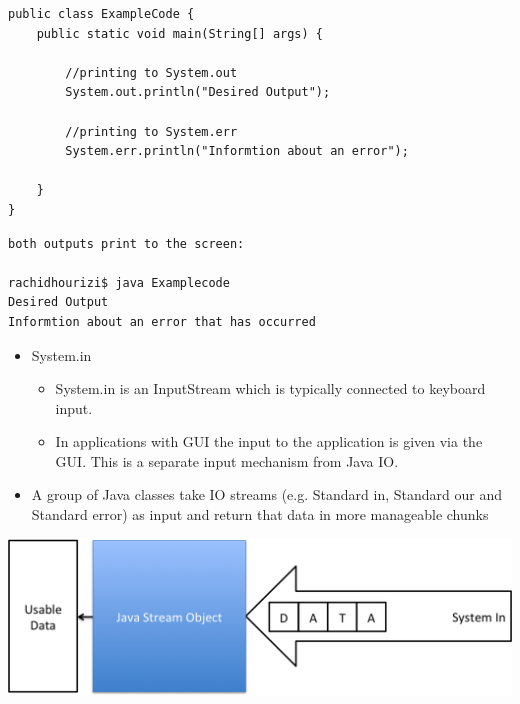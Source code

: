 \documentclass{beamer}
\begin{document}
\begin{frame}[fragile]
\small
\begin{block}{}
\begin{lstlisting}
public class ExampleCode {
	public static void main(String[] args) {
        
        //printing to System.out
        System.out.println("Desired Output");
        
        //printing to System.err
        System.err.println("Informtion about an error");

    }
}
\end{lstlisting}
\end{block}

\begin{block}{}
\begin{lstlisting}
both outputs print to the screen:

rachidhourizi$ java Examplecode
Desired Output
Informtion about an error that has occurred

\end{lstlisting}
\end{block}

\end{frame}

\begin{frame}

\begin{itemize}
\item System.in

\begin{itemize}
\item System.in is an InputStream which is typically connected to keyboard input. 
\item In applications with GUI the input to the application is given via the GUI. This is a separate input mechanism
from Java IO.
\end{itemize}
\end{itemize}

\end{frame}\begin{frame}

\begin{itemize}
\item A group of Java classes take IO streams (e.g. Standard in, Standard our and Standard
error) as input and return that data in more manageable chunks
\end{itemize}
\end{frame}

\begin{frame}[fragile]
\includegraphics[scale=0.5]{Stream2.png}
\end{frame}
\end{document}
